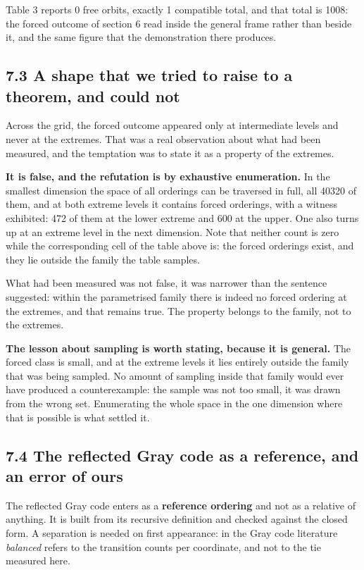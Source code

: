 \documentclass[11pt,a4paper]{article}
\begin{document}
Table 3 reports 0 free orbits, exactly 1 compatible total, and that total is 1008: the forced outcome of section 6 read inside the general frame rather than beside it, and the same figure that the demonstration there produces.

\subsection*{7.3 A shape that we tried to raise to a theorem, and could not}

Across the grid, the forced outcome appeared only at intermediate levels and never at the extremes. That was a real observation about what had been measured, and the temptation was to state it as a property of the extremes.

\textbf{It is false, and the refutation is by exhaustive enumeration.} In the smallest dimension the space of all orderings can be traversed in full, all 40320 of them, and at both extreme levels it contains forced orderings, with a witness exhibited: 472 of them at the lower extreme and 600 at the upper. One also turns up at an extreme level in the next dimension. Note that neither count is zero while the corresponding cell of the table above is: the forced orderings exist, and they lie outside the family the table samples.

What had been measured was not false, it was narrower than the sentence suggested: within the parametrised family there is indeed no forced ordering at the extremes, and that remains true. The property belongs to the family, not to the extremes.

\textbf{The lesson about sampling is worth stating, because it is general.} The forced class is small, and at the extreme levels it lies entirely outside the family that was being sampled. No amount of sampling inside that family would ever have produced a counterexample: the sample was not too small, it was drawn from the wrong set. Enumerating the whole space in the one dimension where that is possible is what settled it.

\subsection*{7.4 The reflected Gray code as a reference, and an error of ours}

The reflected Gray code enters as a \textbf{reference ordering} and not as a relative of anything. It is built from its recursive definition and checked against the closed form. A separation is needed on first appearance: in the Gray code literature \emph{balanced} refers to the transition counts per coordinate, and not to the tie measured here.
\end{document}
